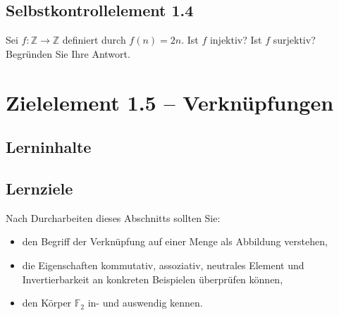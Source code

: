 \documentclass[a4paper,12pt]{article}
\begin{document}
\subsection*{Selbstkontrollelement 1.4}

Sei $f: \mathbb{Z} \to \mathbb{Z}$ definiert durch $f(n) = 2n$.
Ist $f$ injektiv? Ist $f$ surjektiv? Begründen Sie Ihre Antwort.

\newpage

\section*{Zielelement 1.5 -- Verknüpfungen}

\subsection*{Lerninhalte}

\begin{center}
\end{center}

\subsection*{Lernziele}

Nach Durcharbeiten dieses Abschnitts sollten Sie:
\begin{itemize}
  \item den Begriff der Verknüpfung auf einer Menge als Abbildung verstehen,
  \item die Eigenschaften kommutativ, assoziativ, neutrales Element und
        Invertierbarkeit an konkreten Beispielen überprüfen können,
  \item den Körper $\mathbb{F}_2$ in- und auswendig kennen.
\end{itemize}
\end{document}
